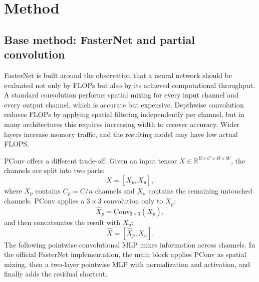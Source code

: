 \documentclass{article}
\begin{document}
\section{Method}

\subsection{Base method: FasterNet and partial convolution}

FasterNet is built around the observation that a neural network should be evaluated not only by FLOPs but also by its achieved computational throughput. A standard convolution performs spatial mixing for every input channel and every output channel, which is accurate but expensive. Depthwise convolution reduces FLOPs by applying spatial filtering independently per channel, but in many architectures this requires increasing width to recover accuracy. Wider layers increase memory traffic, and the resulting model may have low actual FLOPS.

PConv offers a different trade-off. Given an input tensor $X \in \mathbb{R}^{B \times C \times H \times W}$, the channels are split into two parts:
\begin{equation}
X = [X_p, X_u],
\end{equation}
where $X_p$ contains $C_p = C / n$ channels and $X_u$ contains the remaining untouched channels. PConv applies a $3 \times 3$ convolution only to $X_p$:
\begin{equation}
\hat{X}_p = \mathrm{Conv}_{3 \times 3}(X_p),
\end{equation}
and then concatenates the result with $X_u$:
\begin{equation}
\hat{X} = [\hat{X}_p, X_u].
\end{equation}
The following pointwise convolutional MLP mixes information across channels. In the official FasterNet implementation, the main block applies PConv as spatial mixing, then a two-layer pointwise MLP with normalization and activation, and finally adds the residual shortcut.
\end{document}
